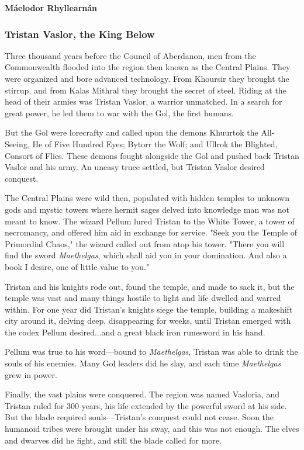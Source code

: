 \documentclass[10pt,a4paper,twoside,bg=print,twocolumn,openany,nodeprecatedcode]{dndbook}
\begin{document}
\textbf{Máelodor Rhyllearnán}

\subsubsection{Tristan Vaslor, the King Below}
Three thousand years before the Council of Aberdanon, men from the Commonwealth flooded into the region then known as the Central Plains. They were organized and bore advanced technology. From Khoursir they brought the stirrup, and from Kalas Mithral they brought the secret of steel. Riding at the head of their armies was Tristan Vaslor, a warrior unmatched. In a search for great power, he led them to war with the Gol, the first humans.

But the Gol were lorecrafty and called upon the demons Khuurtok the All-Seeing, He of Five Hundred Eyes; Bytorr the Wolf; and Ullrok the Blighted, Consort of Flies. These demons fought alongside the Gol and pushed back Tristan Vaslor and his army. An uneasy truce settled, but Tristan Vaslor desired conquest.

The Central Plains were wild then, populated with hidden temples to unknown gods and mystic towers where hermit sages delved into knowledge man was not meant to know. The wizard Pellum lured Tristan to the White Tower, a tower of necromancy, and offered him aid in exchange for service. "Seek you the Temple of Primordial Chaos," the wizard called out from atop his tower. "There you will find the sword \textit{Maethelgas}, which shall aid you in your domination. And also a book I desire, one of little value to you."

Tristan and his knights rode out, found the temple, and made to sack it, but the temple was vast and many things hostile to light and life dwelled and warred within. For one year did Tristan's knights siege the temple, building a makeshift city around it, delving deep, disappearing for weeks, until Tristan emerged with the codex Pellum desired...and a great black iron runesword in his hand.

Pellum was true to his word—bound to \textit{Maethelgas}, Tristan was able to drink the souls of his enemies. Many Gol leaders did he slay, and each time \textit{Maethelgas} grew in power.

Finally, the vast plains were conquered. The region was named Vasloria, and Tristan ruled for 300 years, his life extended by the powerful sword at his side. But the blade required souls—Tristan's conquest could not cease. Soon the humanoid tribes were brought under his sway, and this was not enough. The elves and dwarves did he fight, and still the blade called for more.
\end{document}
